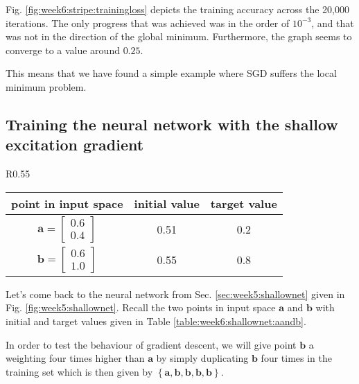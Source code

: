 \documentclass{article}
\let\vec\mathbf
\begin{document}
Fig. \ref{fig:week6:stripe:trainingloss} depicts the training accuracy across the 20,000 iterations.
The only progress that was achieved was in the order of $10^{-3}$, and that was not in the direction of the global minimum.
Furthermore, the graph seems to converge to a value around $0.25$.

This means that we have found a simple example where SGD suffers the local minimum problem.

\clearpage
\subsection{Training the neural network with the shallow excitation gradient}

\begin{wraptable}{R}{0.55\textwidth}
    \begin{tabular}{c|c|c}
        point in input space & initial value & target value \\
        \hline
        $\vec{a} = \begin{bmatrix}
            0.6 \\ 0.4
        \end{bmatrix}$
        &  0.51 & 0.2 \\
        $\vec{b} = \begin{bmatrix}
            0.6 \\ 1.0
        \end{bmatrix}$
        &  0.55 & 0.8
    \end{tabular}
    \caption{Initial and target values for $\vec{a}$ and $\vec{b}$.}
    \label{table:week6:shallownet:aandb}
\end{wraptable}
Let's come back to the neural network from Sec. \ref{sec:week5:shallownet} given in Fig. \ref{fig:week5:shallownet}.
Recall the two points in input space $\vec{a}$ and $\vec{b}$ with initial and target values given in Table \ref{table:week6:shallownet:aandb}.

In order to test the behaviour of gradient descent, we will give point $\vec{b}$ a weighting four times higher than $\vec{a}$ by simply duplicating $\vec{b}$ four times in the training set which is then given by $\left\{ \vec{a}, \vec{b}, \vec{b}, \vec{b}, \vec{b}\right\}$.
\end{document}
